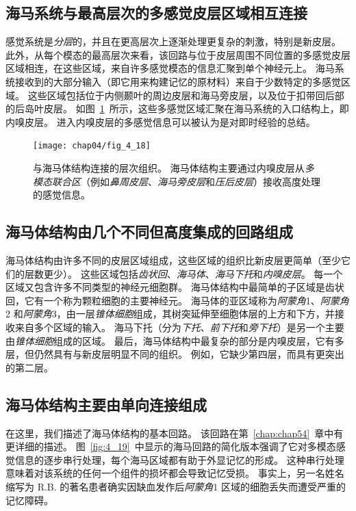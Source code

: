 \subsection{海马系统与最高层次的多感觉皮层区域相互连接}

感觉系统是\textit{分层}的，并且在更高层次上逐渐处理更复杂的刺激，特别是新皮层。
此外，从每个模态的最高层次来看，该回路与位于皮层周围不同位置的多感觉皮层区域相连，在这些区域，来自许多感觉模态的信息汇聚到单个神经元上。
海马系统接收到的大部分输入（即它用来构建记忆的原材料）来自于少数特定的多感觉区域。
这些区域包括位于内侧颞叶的周边皮层和海马旁皮层，以及位于扣带回后部的后岛叶皮层。
如图~\ref{fig:4_18}~所示，这些多感觉区域汇聚在海马系统的入口结构上，即内嗅皮层。 
进入内嗅皮层的多感觉信息可以被认为是对即时经验的总结。


\begin{figure}[htbp]
	\centering
	\texttt{[image: chap04/fig\_4\_18]}
	\caption{与海马体结构连接的层次组织。
		海马体结构主要通过内嗅皮层从\textit{多模态联合区}（例如\textit{鼻周皮层}、\textit{海马旁皮层}和\textit{压后皮层}）接收高度处理的感觉信息。}
	\label{fig:4_18}
\end{figure}



\subsection{海马体结构由几个不同但高度集成的回路组成}

海马体结构由许多不同的皮层区域组成，这些区域的组织比新皮层更简单（至少它们的层数更少）。
这些区域包括\textit{齿状回}、\textit{海马体}、\textit{海马下托}和\textit{内嗅皮层}。 
每一个区域又包含许多不同类型的神经元细胞群。
海马体结构中最简单的子区域是齿状回，它有一个称为颗粒细胞的主要神经元。
海马体的亚区域称为\textit{阿蒙角}1、\textit{阿蒙角}2 和\textit{阿蒙角}3，由一层\textit{锥体细胞}组成，其树突延伸至细胞体层的上方和下方，并接收来自多个区域的输入。
海马下托（分为\textit{下托}、\textit{前下托}和\textit{旁下托}）是另一个主要由\textit{锥体细胞}组成的区域。
最后，海马体结构中最复杂的部分是内嗅皮层，它有多层，但仍然具有与新皮层明显不同的组织。
例如，它缺少第四层，而具有更突出的第二层。



\subsection{海马体结构主要由单向连接组成}

在这里，我们描述了海马体结构的基本回路。
该回路在第~\ref{chap:chap54}~章中有更详细的描述。
图~\ref{fig:4_19}~中显示的海马回路的简化版本强调了它对多模态感觉信息的逐步串行处理，每个海马区域都有助于外显记忆的形成。
这种串行处理意味着对该系统的任何一个组件的损坏都会导致记忆受损。
事实上，另一名姓名缩写为 R.B. 的著名患者确实因缺血发作后\textit{阿蒙角}1 区域的细胞丢失而遭受严重的记忆障碍。


